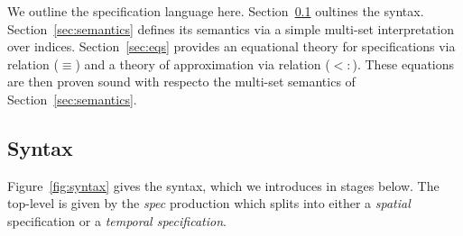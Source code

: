 \documentclass[9pt]{sigplanconf}
\theoremstyle{definition}
\begin{document}
We outline the specification language here. Section~\ref{sec:syntax}
oultines the syntax. Section~\ref{sec:semantics} defines its semantics
via a simple multi-set interpretation over indices. Section~\ref{sec:eqs} provides an
equational theory for specifications via relation ($\equiv$) and a
theory of approximation via relation ($<:$). These equations are then
proven sound with respecto the multi-set semantics of Section~\ref{sec:semantics}.

\subsection{Syntax}
\label{sec:syntax}

Figure~\ref{fig:syntax}
gives the syntax, which we introduces in stages below.
The top-level is given by the \textit{spec} production
which splits into either a \textit{spatial} specification or
a \textit{temporal specification}.
\end{document}
